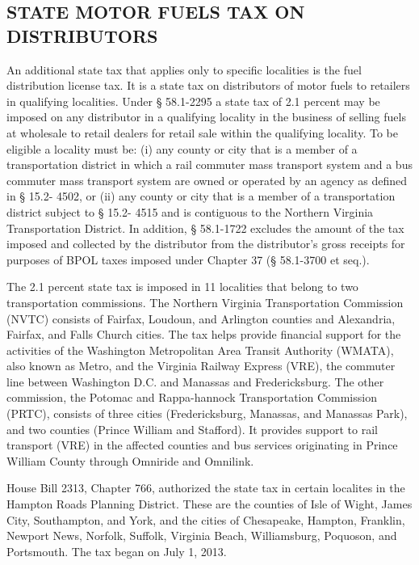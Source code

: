 \documentclass[
]{book}
\begin{document}
\hypertarget{state-motor-fuels-tax-on-distributors}{%
\subsection{STATE MOTOR FUELS TAX ON DISTRIBUTORS}\label{state-motor-fuels-tax-on-distributors}}

An additional state tax that applies only to specific localities is the fuel distribution license tax. It is a state tax on distributors of motor fuels to retailers in qualifying localities. Under § 58.1-2295 a state tax of 2.1 percent may be imposed on any distributor in a qualifying locality in the business of selling fuels at wholesale to retail dealers for retail sale within the qualifying locality. To be eligible a locality must be: (i) any county or city that is a member of a transportation district in which a rail commuter mass transport system and a bus commuter mass transport system are owned or operated by an agency as defined in § 15.2- 4502, or (ii) any county or city that is a member of a transportation district subject to § 15.2- 4515 and is contiguous to the Northern Virginia Transportation District. In addition, § 58.1-1722 excludes the amount of the tax imposed and collected by the distributor from the distributor's gross receipts for purposes of BPOL taxes imposed under Chapter 37 (§ 58.1-3700 et seq.).

The 2.1 percent state tax is imposed in 11 localities that belong to two transportation commissions. The Northern Virginia Transportation Commission (NVTC) consists of Fairfax, Loudoun, and Arlington counties and Alexandria, Fairfax, and Falls Church cities. The tax helps provide financial support for the activities of the Washington Metropolitan Area Transit Authority (WMATA), also known as Metro, and the Virginia Railway Express (VRE), the commuter line between Washington D.C. and Manassas and Fredericksburg. The other commission, the Potomac and Rappa-hannock Transportation Commission (PRTC), consists of three cities (Fredericksburg, Manassas, and Manassas Park), and two counties (Prince William and Stafford). It provides support to rail transport (VRE) in the affected counties and bus services originating in Prince William County through Omniride and Omnilink.

House Bill 2313, Chapter 766, authorized the state tax in certain localites in the Hampton Roads Planning District. These are the counties of Isle of Wight, James City, Southampton, and York, and the cities of Chesapeake, Hampton, Franklin, Newport News, Norfolk, Suffolk, Virginia Beach, Williamsburg, Poquoson, and Portsmouth. The tax began on July 1, 2013.
\end{document}
